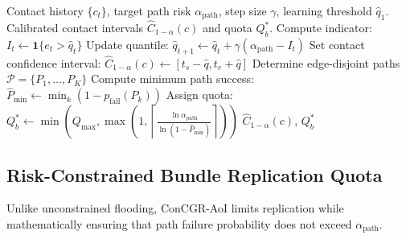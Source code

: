 \documentclass[preprint,12pt,5p,twocolumn]{elsarticle}
\begin{document}
\begin{algorithm}[t]
\caption{Online ACI Contact Calibration and Replication Quota Assignment}
\label{alg:aci_quota}
\begin{algorithmic}[1]
\REQUIRE Contact history $\{c_t\}$, target path risk $\alpha_{\text{path}}$, step size $\gamma$, learning threshold $\hat{q}_1$.
\ENSURE Calibrated contact intervals $\hat{C}_{1-\alpha}(c)$ and quota $Q_b^*$.
    \STATE Compute indicator: $I_t \leftarrow \mathbf{1}\{e_t > \hat{q}_t\}$
    \STATE Update quantile: $\hat{q}_{t+1} \leftarrow \hat{q}_t + \gamma (\alpha_{\text{path}} - I_t)$
\ENDFOR
\STATE Set contact confidence interval: $\hat{C}_{1-\alpha}(c) \leftarrow [t_s - \hat{q}, t_e + \hat{q}]$
\STATE Determine edge-disjoint paths $\mathcal{P} = \{P_1, \dots, P_K\}$
\STATE Compute minimum path success: $\hat{P}_{\min} \leftarrow \min_{k} (1 - p_{\text{fail}}(P_k))$
\STATE Assign quota: $Q_b^* \leftarrow \min\left(Q_{\max}, \max\left(1, \left\lceil \frac{\ln \alpha_{\text{path}}}{\ln (1 - \hat{P}_{\min})} \right\rceil \right)\right)$
\RETURN $\hat{C}_{1-\alpha}(c)$, $Q_b^*$
\end{algorithmic}
\end{algorithm}

\subsection{Risk-Constrained Bundle Replication Quota}
Unlike unconstrained flooding, ConCGR-AoI limits replication while mathematically ensuring that path failure probability does not exceed $\alpha_{\text{path}}$.
\end{document}
